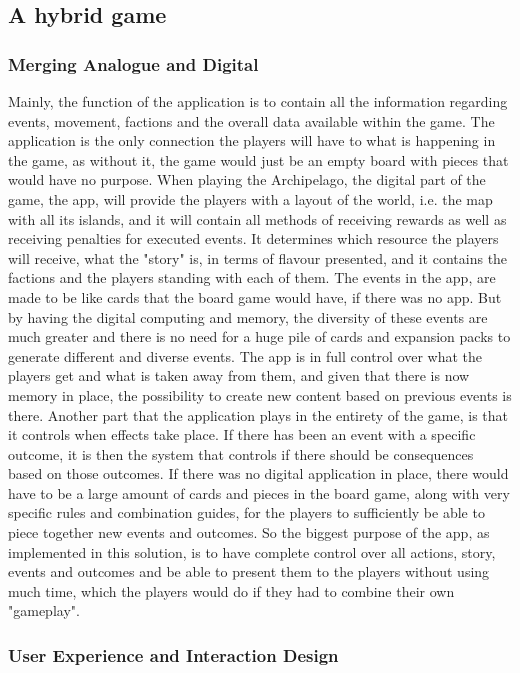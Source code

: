 \subsection{A hybrid game}
\subsubsection{Merging Analogue and Digital}
Mainly, the function of the application is to contain all the information regarding events, movement, factions and the overall data available within the game. The application is the only connection the players will have to what is happening in the game, as without it, the game would just be an empty board with pieces that would have no purpose. 
When playing the Archipelago, the digital part of the game, the app, will provide the players with a layout of the world, i.e. the map with all its islands, and it will contain all methods of receiving rewards as well as receiving penalties for executed events. It determines which resource the players will receive, what the "story" is, in terms of flavour presented, and it contains the factions and the players standing with each of them.
The events in the app, are made to be like cards that the board game would have, if there was no app. But by having the digital computing and memory, the diversity of these events are much greater and there is no need for a huge pile of cards and expansion packs to generate different and diverse events. The app is in full control over what the players get and what is taken away from them, and given that there is now memory in place, the possibility to create new content based on previous events is there. Another part that the application plays in the entirety of the game, is that it controls when effects take place. If there has been an event with a specific outcome, it is then the system that controls if there should be consequences based on those outcomes. If there was no digital application in place, there would have to be a large amount of cards and pieces in the board game, along with very specific rules and combination guides, for the players to sufficiently be able to piece together new events and outcomes. So the biggest purpose of the app, as implemented in this solution, is to have complete control over all actions, story, events and outcomes and be able to present them to the players without using much time, which the players would do if they had to combine their own "gameplay".
\subsubsection{User Experience and Interaction Design}


